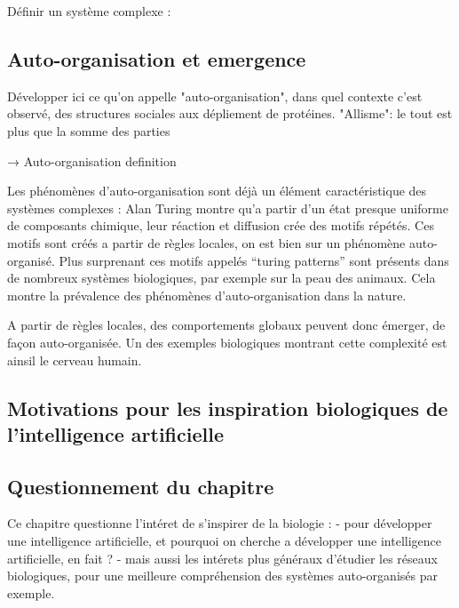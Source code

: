 Définir un système complexe : 

\subsection{Auto-organisation et emergence}

Développer ici ce qu'on appelle "auto-organisation", dans quel contexte c'est observé, des structures sociales aux dépliement de protéines. 
"Allisme": le tout est plus que la somme des parties

→ Auto-organisation definition

Les phénomènes d’auto-organisation sont déjà un élément caractéristique des systèmes complexes : Alan Turing montre qu’a partir d’un état presque uniforme de composants chimique, leur réaction et diffusion crée des motifs répétés. Ces motifs sont créés a partir de règles locales, on est bien sur un phénomène auto-organisé. Plus surprenant ces motifs appelés “turing patterns” sont présents dans de nombreux systèmes biologiques, par exemple sur la peau des animaux. Cela montre la prévalence des phénomènes d’auto-organisation dans la nature. 

A partir de règles locales, des comportements globaux peuvent donc émerger, de façon auto-organisée. Un des exemples biologiques montrant cette complexité est ainsil le cerveau humain. 

\subsection{Motivations pour les inspiration biologiques de l'intelligence artificielle}



\subsection{Questionnement du chapitre}

Ce chapitre questionne l'intéret de s'inspirer de la biologie : 
- pour développer une intelligence artificielle, et pourquoi on cherche a développer une intelligence artificielle, en fait ? 
- mais aussi les intérets plus généraux d'étudier les réseaux biologiques, pour une meilleure compréhension des systèmes auto-organisés par exemple. 


